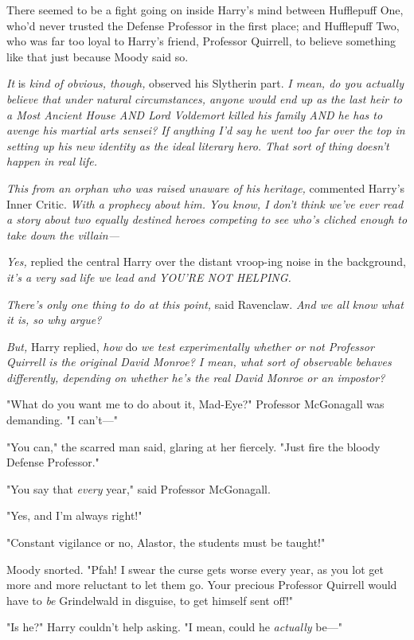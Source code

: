 There seemed to be a fight going on inside Harry's mind between Hufflepuff One,
who'd never trusted the Defense Professor in the first place; and Hufflepuff
Two, who was far too loyal to Harry's friend, Professor Quirrell, to believe
something like that just because Moody said so.

\emph{It} is \emph{kind of obvious, though,} observed his Slytherin part.
\emph{I mean, do you actually believe that under natural circumstances, anyone
would end up as the last heir to a Most Ancient House AND Lord Voldemort killed
his family AND he has to avenge his martial arts sensei? If anything I'd say he
went too far over the top in setting up his new identity as the ideal literary
hero. That sort of thing doesn't happen in real life.}

\emph{This from an orphan who was raised unaware of his heritage,} commented
Harry's Inner Critic. \emph{With a prophecy about him. You know, I don't think
we've ever read a story about two equally destined heroes competing to see
who's cliched enough to take down the villain---}

\emph{Yes,} replied the central Harry over the distant vroop-ing noise in the
background, \emph{it's a very sad life we lead and YOU'RE NOT HELPING.}

\emph{There's only one thing to do at this point,} said Ravenclaw. \emph{And we
all know what it is, so why argue?}

\emph{But,} Harry replied, \emph{how} do \emph{we test experimentally whether
or not Professor Quirrell is the original David Monroe? I mean, what sort of
observable behaves differently, depending on whether he's the real David Monroe
or an impostor?}

"What do you want me to do about it, Mad-Eye?" Professor McGonagall was
demanding. "I can't---"

"You can," the scarred man said, glaring at her fiercely. "Just fire the bloody
Defense Professor."

"You say that \emph{every} year," said Professor McGonagall.

"Yes, and I'm always right!"

"Constant vigilance or no, Alastor, the students must be taught!"

Moody snorted. "Pfah! I swear the curse gets worse every year, as you lot get
more and more reluctant to let them go. Your precious Professor Quirrell would
have to \emph{be} Grindelwald in disguise, to get himself sent off!"

"Is he?" Harry couldn't help asking. "I mean, could he \emph{actually} be---"

